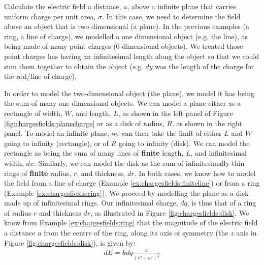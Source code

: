 \begin{example}{\label{ex:chargesfields:squarecircle}Calculate the electric field a distance, $a$, above a infinite plane that carries uniform charge per unit area, $\sigma$.}
In this case, we need to determine the field above an object that is two dimensional (a plane). In the previous examples (a ring, a line of charge), we modelled a one dimensional object (e.g. the line), as being made of many point charges (0-dimensional objects). We treated those point charges has having an infinitesimal length along the object so that we could sum them together to obtain the object (e.g. $dy$ was the length of the charge for the rod/line of charge).
 
In order to model the two-dimensional object (the plane), we model it has being the sum of many one dimensional objects. We can model a plane either as a rectangle of width, $W$, and length, $L$, as shown in the left panel of Figure \ref{fig:chargesfields:planecharge} or as a disk of radius, $R$, as shown in the right panel. To model an infinite plane, we can then take the limit of either $L$ and $W$ going to infinity (rectangle), or of $R$ going to infinity (disk). We can model the rectangle as being the sum of many lines of \textbf{finite} length, $L$, and infinitesimal width, $dx$. Similarly, we can model the disk as the sum of infinitesimally thin rings of \textbf{finite} radius, $r$, and thickness, $dr$. In both cases, we know how to model the field from a line of charge (Example \ref{ex:chargesfields:finiteline}) or from a ring (Example \ref{ex:chargesfields:ring}). 
We proceed by modelling the plane as a disk made up of infinitesimal rings. Our infinitesimal charge, $dq$, is thus that of a ring of radius $r$ and thickness $dr$, as illustrated in Figure \ref{fig:chargesfields:disk}.
We know from Example \ref{ex:chargesfields:ring} that the magnitude of the electric field a distance $a$ from the centre of the ring, along its axis of symmetry (the $z$ axis in Figure \ref{fig:chargesfields:disk}), is given by:
\begin{align*}
dE = kdq\frac{a}{(r^2+a^2)^\frac{3}{2}} 
\end{align*}

\end{example}

